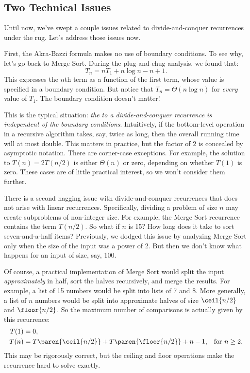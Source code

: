 \subsection{Two Technical Issues}

Until now, we've swept a couple issues related to divide-and-conquer
recurrences under the rug.  Let's address those issues now.

First, the Akra-Bazzi formula makes no use of boundary conditions.  To
see why, let's go back to Merge Sort.  During the plug-and-chug
analysis, we found that:
\[
T_n = n T_1 + n \log n - n + 1.
\]
This expresses the $n$th term as a function of the first term, whose
value is specified in a boundary condition.  But notice that $T_n =
\Theta(n \log n)$ for \emph{every} value of $T_1$.  The boundary
condition doesn't matter!

This is the typical situation: \emph{the  to a
  divide-and-conquer recurrence is independent of the boundary
  conditions}.  Intuitively, if the bottom-level operation in a
recursive algorithm takes, say, twice as long, then the overall
running time will at most double.  This matters in practice, but the
factor of 2 is concealed by asymptotic notation.  There are
corner-case exceptions.  For example, the solution to $T(n) = 2
T(n/2)$ is either $\Theta(n)$ or zero, depending on whether $T(1)$ is
zero.  These cases are of little practical interest, so we won't
consider them further.

There is a second nagging issue with divide-and-conquer recurrences
that does not arise with linear recurrences.  Specifically, dividing
a problem of size $n$ may create subproblems of non-integer size.  For
example, the Merge Sort recurrence contains the term $T(n/2)$.  So
what if $n$ is 15?  How long does it take to sort seven-and-a-half
items?  Previously, we dodged this issue by analyzing Merge Sort only
when the size of the input was a power of 2.  But then we don't know
what happens for an input of size, say, 100.

Of course, a practical implementation of Merge Sort would split the
input \emph{approximately} in half, sort the halves recursively, and
merge the results.  For example, a list of 15 numbers would be split
into lists of 7 and 8.  More generally, a list of $n$ numbers would be
split into approximate halves of size $\ceil{n / 2}$ and
$ \floor{n / 2}$.  So the maximum number of comparisons is
actually given by this recurrence:
\begin{align*}
T(1) & = 0, \\
T(n) & = T\paren{\ceil{n/2}} + T\paren{\floor{n/2}}+ n - 1, & \text{for $n \geq 2$.}
\end{align*}
This may be rigorously correct, but the ceiling and floor operations
make the recurrence hard to solve exactly.


